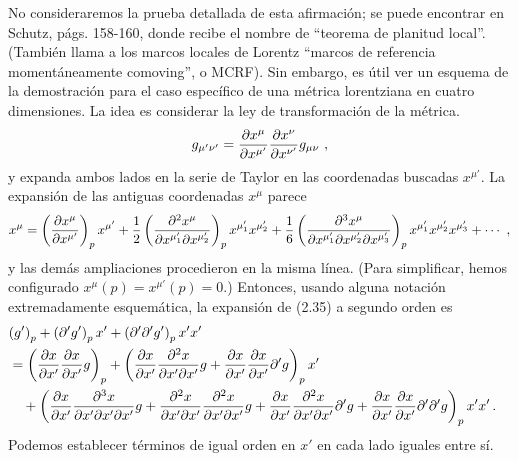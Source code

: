 \documentclass[11pt,b5paper,openany,twoside]{book}
\newcommand{\mn}{{\mu\nu}}
\begin{document}
No consideraremos la prueba detallada de esta afirmación; se puede encontrar en Schutz, págs. 158-160, donde recibe el nombre de ``teorema de planitud local''. (También llama a los marcos locales de Lorentz ``marcos de referencia momentáneamente comoving'', o MCRF).
Sin embargo, es útil ver un esquema de la demostración para el caso específico de una métrica lorentziana en cuatro dimensiones.
La idea es considerar la ley de transformación de la métrica.
\begin{equation}
g_{\mu'\nu'} = {{\partial x^\mu}\over{\partial x^{\mu'}}}
{{\partial x^\nu}\over{\partial x^{\nu'}}} g_\mn\ ,\label{2.35}
\end{equation}
y expanda ambos lados en la serie de Taylor en las coordenadas buscadas $x^{\mu'}$.
La expansión de las antiguas coordenadas $x^\mu$ parece
\begin{equation}
x^\mu = \left({{\partial x^\mu}\over{\partial x^{\mu'}}}\right)_p
x^{\mu'} + {1\over 2} \left({{\partial^2 x^\mu}\over
{\partial x^{\mu_1'}\partial x^{\mu_2'}}}\right)_p
x^{\mu_1'}x^{\mu_2'} + {1\over 6} \left({{\partial^3 x^\mu}\over
{\partial x^{\mu_1'}\partial x^{\mu_2'}\partial x^{\mu_3'}}}\right)_p
x^{\mu_1'}x^{\mu_2'}x^{\mu_3'} +\cdots\ ,\label{2.36}
\end{equation}
y las demás ampliaciones procedieron en la misma línea.
(Para simplificar, hemos configurado $x^\mu(p)=x^{\mu'}(p)=0$.)
Entonces, usando alguna notación extremadamente esquemática, la expansión de (2.35) a segundo orden es
\begin{align}
\lefteqn{\left(g'\right)_p + \left(\partial' g'\right)_p x' +
\left(\partial'\partial' g'\right)_p x' x'}\nonumber \\
&=
\left({{\partial x}\over{\partial x'}}{{\partial x}\over{\partial x'}}
g\right)_p + \left({{\partial x}\over{\partial x'}}
{{\partial^2 x}\over{\partial x'\partial x'}}g +
{{\partial x}\over{\partial x'}}{{\partial x}\over{\partial x'}}
\partial' g\right)_p x' \nonumber \\
&\quad + \left({{\partial x}\over{\partial x'}}
{{\partial^3 x}\over{\partial x'\partial x'\partial x'}}g +
{{\partial^2 x}\over{\partial x'\partial x'}}
{{\partial^2 x}\over{\partial x'\partial x'}}g +
{{\partial x}\over{\partial x'}}
{{\partial^2 x}\over{\partial x'\partial x'}}\partial' g +
{{\partial x}\over{\partial x'}}{{\partial x}\over{\partial x'}}
\partial'\partial' g\right)_p x' x'\,. \label{2.37}
\end{align}
Podemos establecer términos de igual orden en $x'$ en cada lado iguales entre sí.
\end{document}
